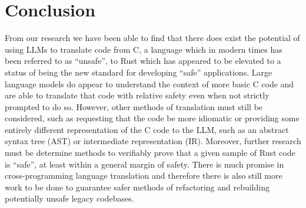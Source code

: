 \documentclass[conference]{IEEEtran}
\begin{document}
\section{Conclusion}
From our research we have been able to find that there does exist the potential of using LLMs to translate code from C, a
language which in modern times has been referred to as ``unsafe'', to Rust which has appeared to be elevated to a status of being
the new standard for developing ``safe'' applications. Large language models do appear to understand the context of more basic C
code and are able to translate that code with relative safety even when not strictly prompted to do so. However, other methods of
translation must still be considered, such as requesting that the code be more idiomatic or providing some entirely different
representation of the C code to the LLM, such as an abstract syntax tree (AST) or intermediate representation (IR). Moreover,
further research must be determine methods to verifiably prove that a given sample of Rust code is ``safe'', at least within a
general margin of safety. There is much promise in cross-programming language translation and therefore there is also still more
work to be done to guarantee safer methods of refactoring and rebuilding potentially unsafe legacy codebases.



\end{document}
